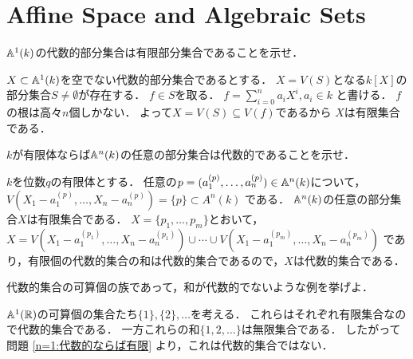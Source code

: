 \section{Affine Space and Algebraic Sets}
\begin{prob} \label{n=1:代数的ならば有限}
  $\mathbb{A}^{1}(k)$の代数的部分集合は有限部分集合であることを示せ．
\end{prob}
\begin{ans}
  $X \subset \mathbb{A}^1(k)$を空でない代数的部分集合であるとする．
  $X = V( S )$となる$k[X]$の部分集合$S \ne \emptyset$が存在する．
  $f \in S$を取る．
  $f = \sum_{i=0}^n a_i X^i, a_i \in k$
  と書ける．
  $f$の根は高々$n$個しかない．
  よって$X = V(S) \subseteq V(f)$であるから
  $X$は有限集合である．
\end{ans}

\begin{prob}
  $k$が有限体ならば$\mathbb{A}^n(k)$の任意の部分集合は代数的であることを示せ．
\end{prob}
\begin{ans}
  $k$を位数$q$の有限体とする．
  任意の$p = (a^{(p)}_1, \dots , a^{(p)}_n ) \in \mathbb{A}^n(k)$について，
  $V( X_1 - a^{(p)}_1, \dots , X_n - a^{(p)}_n ) = \{ p \} \subset A^n(k)$
  である．
  $\mathbb{A}^n(k)$の任意の部分集合$X$は有限集合である．
  $X = \{ p_1, \dots , p_m \}$とおいて，
  $X = V(X_1 - a^{(p_1)}_1, \dots , X_n - a^{(p_1)}_n ) \cup \cdots \cup V(X_1 - a^{(p_m)}_1, \dots , X_n - a^{(p_m)}_n ) $
  であり，有限個の代数的集合の和は代数的集合であるので，$X$は代数的集合である．
\end{ans}

\begin{prob}
  代数的集合の可算個の族であって，和が代数的でないような例を挙げよ．
\end{prob}
\begin{ans}
  $\mathbb{A}^1(\mathbb{R})$の可算個の集合たち$\{1\}, \{2\}, \dots $を考える．
  これらはそれぞれ有限集合なので代数的集合である．
  一方これらの和$\{1,2,\dots\}$は無限集合である．
  したがって問題 \ref{n=1:代数的ならば有限} より，これは代数的集合ではない．
\end{ans}

